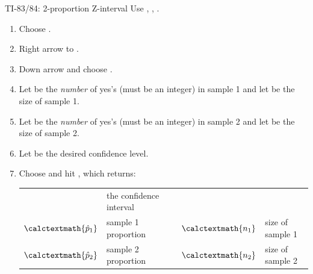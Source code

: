 \begin{onebox}{ TI-83/84: 2-proportion Z-interval}
Use , , .
\begin{enumerate}
\setlength{\itemsep}{0mm}
\item Choose .
\item Right arrow to .
\item Down arrow and choose .
\item Let  be the \emph{number} of yes's (must be an integer) in sample 1 and let  be the size of sample 1.
\item Let  be the \emph{number} of yes's (must be an integer) in sample 2 and let  be the size of sample 2.
\item Let  be the desired confidence level.
\item Choose  and hit , which returns: \\
\begin{tabular}{ll l ll}
\calctext{(\underline{\ \ },\underline{\ \ })} & the confidence interval \\
$\calctextmath{\hat{p}_1}$ & sample 1 proportion &\quad&
	$\calctextmath{n_1}$ & size of sample 1 \\
$\calctextmath{\hat{p}_2}$ & sample 2 proportion &&
	$\calctextmath{n_2}$ &  size of sample 2
\end{tabular}
\end{enumerate}
\end{onebox}

